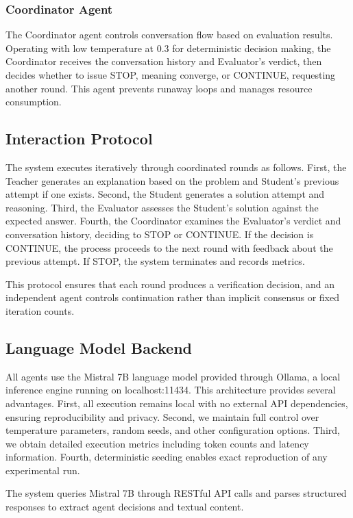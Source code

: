 \documentclass[conference]{IEEEtran}
\begin{document}
\subsubsection{Coordinator Agent}
The Coordinator agent controls conversation flow based on evaluation results. Operating with low temperature at 0.3 for deterministic decision making, the Coordinator receives the conversation history and Evaluator's verdict, then decides whether to issue STOP, meaning converge, or CONTINUE, requesting another round. This agent prevents runaway loops and manages resource consumption.

\subsection{Interaction Protocol}

The system executes iteratively through coordinated rounds as follows. First, the Teacher generates an explanation based on the problem and Student's previous attempt if one exists. Second, the Student generates a solution attempt and reasoning. Third, the Evaluator assesses the Student's solution against the expected answer. Fourth, the Coordinator examines the Evaluator's verdict and conversation history, deciding to STOP or CONTINUE. If the decision is CONTINUE, the process proceeds to the next round with feedback about the previous attempt. If STOP, the system terminates and records metrics.

This protocol ensures that each round produces a verification decision, and an independent agent controls continuation rather than implicit consensus or fixed iteration counts.

\subsection{Language Model Backend}

All agents use the Mistral 7B language model provided through Ollama, a local inference engine running on localhost:11434. This architecture provides several advantages. First, all execution remains local with no external API dependencies, ensuring reproducibility and privacy. Second, we maintain full control over temperature parameters, random seeds, and other configuration options. Third, we obtain detailed execution metrics including token counts and latency information. Fourth, deterministic seeding enables exact reproduction of any experimental run.

The system queries Mistral 7B through RESTful API calls and parses structured responses to extract agent decisions and textual content.
\end{document}
